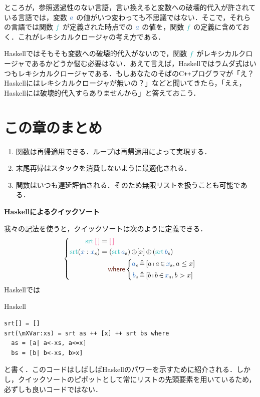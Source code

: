 \documentclass[a5paper,twoside,fleqn,draft]{jsbook}
\def\constantColor{WildStrawberry}
\def\keywordColor{Sepia}
\def\varColor{NavyBlue}
\def\funcColor{BlueGreen}
\newcommand{\programminglanguage}[1]{\textsf{#1}}
\newcommand{\cxx}{\programminglanguage{C}\texttt{++}}
\newcommand{\haskell}{\programminglanguage{Haskell}}
\newenvironment{note}[1]{\begin{boxnote}\begin{center}\textbf{#1}\end{center}}{\end{boxnote}}
\newenvironment{haskellcode}{\begin{itembox}[r]{\haskell}}{\end{itembox}}
\newcommand{\mKeyword}[1]{\textcolor{\keywordColor}{\mathsf{#1}}}
\newcommand{\mWhereKeyword}{\mKeyword{where}}
\DeclareMathOperator{\mWhere}{\mWhereKeyword}
\newcommand{\mEmptyList}{{\textcolor{\constantColor}{[\,]}}}
\newcommand{\mVar}[1]{\textcolor{\varColor}{#1}}
\newcommand{\mAVar}{{\mVar{a}}}
\newcommand{\mXVar}{\mVar{x}}
\newcommand{\mFunc}[1]{\textcolor{\funcColor}{#1}}
\newcommand{\mSpecialFunc}[1]{\textcolor{\funcColor}{\textrm{#1}}}
\newcommand{\mFFunc}{{\mFunc{f}}}
\DeclareMathOperator{\mSort}{\mSpecialFunc{srt}}
\DeclareMathOperator{\mAppend}{\oplus}
\DeclareMathOperator{\mFrom}{\in}
\DeclareMathOperator{\mLetEq}{\triangleq}
\newcommand{\mList}[1]{\mVar{#1}_\mathrm{s}}
\DeclareMathOperator{\mListComp}{\shortmid}
\begin{document}
ところが，参照透過性のない言語，言い換えると変数への破壊的代入が許されている言語では，変数 $\mAVar$ の値がいつ変わっても不思議ではない．そこで，それらの言語では関数 $\mFFunc$ が定義された時点での $\mAVar$ の値を，関数 $\mFFunc$ の定義に含めておく．これがレキシカルクロージャの考え方である．

\haskell ではそもそも変数への破壊的代入がないので，関数 $\mFFunc$ がレキシカルクロージャであるかどうか悩む必要はない．あえて言えば，\haskell ではラムダ式はいつもレキシカルクロージャである．もしあなたのそばの\cxx プログラマが「え？\haskell にはレキシカルクロージャが無いの？」などと聞いてきたら，「ええ，\haskell には破壊的代入すらありませんから」と答えておこう．

\section{この章のまとめ}

\begin{enumerate}
\item 関数は再帰適用できる．ループは再帰適用によって実現する．
\item 末尾再帰はスタックを消費しないように最適化される．
\item 関数はいつも遅延評価される．そのため無限リストを扱うことも可能である．
\end{enumerate}

\begin{note}{\haskell によるクイックソート}
我々の記法を使うと，クイックソートは次のように定義できる．
\begin{equation*}
  \left\{
  \begin{aligned}
    \mSort\mEmptyList
    &=\mEmptyList\\
    \mSort(\mXVar:\mList{x})
    &=(\mSort\mList{a})\mAppend[x]\mAppend{}(\mSort\mList{b})\\
    &\quad\mWhere\left\{\begin{aligned}
    \mList{a}&\mLetEq{}[a\mListComp a\mFrom\mList{x},a\le x]\\
    \mList{b}&\mLetEq{}[b\mListComp b\mFrom\mList{x},b>x]
    \end{aligned}
    \right.
  \end{aligned}
  \right.
\end{equation*}
\haskell では %
\begin{haskellcode}
\begin{verbatim}
srt[] = []
srt(\mXVar:xs) = srt as ++ [x] ++ srt bs where
  as = [a| a<-xs, a<=x]
  bs = [b| b<-xs, b>x]
\end{verbatim}
\end{haskellcode}
と書く．このコードはしばしば\haskell のパワーを示すために紹介される．しかし，クイックソートのピボットとして常にリストの先頭要素を用いているため，必ずしも良いコードではない．
\end{note}
\end{document}
